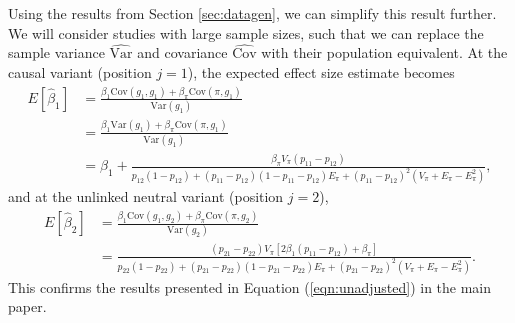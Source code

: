 \documentclass[12pt]{article}
\begin{document}
Using the results from Section \ref{sec:datagen}, we can simplify this result further. We will consider studies with large sample sizes, such that we can replace the sample variance $\widehat{\text{Var}}$ and covariance $\widehat{\text{Cov}}$ with their population equivalent. 
At the causal variant (position $j = 1$), the expected effect size estimate becomes
\begin{align*}
E[\hat\beta_1] & = \frac{\beta_1 \text{Cov}(g_1,g_1) + \beta_\pi \text{Cov}(\pi, g_1)}{\text{Var}(g_1)} \\
& =  \frac{\beta_1 \text{Var}(g_1) + \beta_\pi \text{Cov}(\pi, g_1)}{\text{Var}(g_1)} \\
& = \beta_1 +  \frac{\beta_\pi V_\pi(p_{11}-p_{12})}
  {p_{12}(1-p_{12}) + (p_{11}-p_{12})(1-p_{11}-p_{12})E_\pi + (p_{11}-p_{12})^2(V_\pi+E_\pi-E_\pi^2)},
\end{align*}
and at the unlinked neutral variant (position $j = 2$),
\begin{align*}
E[\hat\beta_2] & = \frac{\beta_1 \text{Cov}(g_1,g_2) + \beta_\pi \text{Cov}(\pi, g_2)}{\text{Var}(g_2)}\\
& = \frac{(p_{21}-p_{22})V_\pi[2\beta_1 (p_{11}-p_{12}) + \beta_\pi]}{p_{22}(1-p_{22}) + (p_{21}-p_{22})(1-p_{21}-p_{22})E_\pi + (p_{21}-p_{22})^2(V_\pi + E_\pi - E_\pi^2)} .
\end{align*}
This confirms the results presented in Equation (\ref{eqn:unadjusted}) in the main paper.

\end{document}
